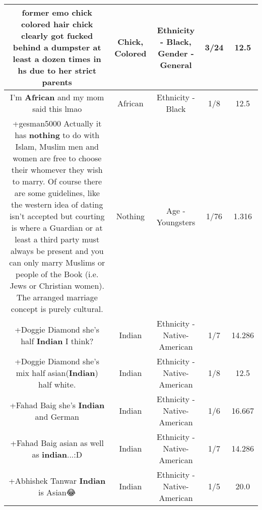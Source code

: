 \documentclass[11pt]{article}
\newlength\mylength
\begin{document}
\begin{center}
\begin{longtable}{|C{.65\mylength}|C{.30\mylength}|C{.12\mylength}|C{.12\mylength}|C{.12\mylength}|}
  \small former emo \textbf{chick} \textbf{colored} hair \textbf{chick} clearly got fucked behind a dumpster at least a dozen times in hs due to her strict parents\normalsize   & Chick, Colored & Ethnicity - Black, Gender - General & 3/24 & 12.5 \\  \hline
  \small I'm \textbf{African} and my mom said this lmao\normalsize   & African & Ethnicity - Black & 1/8 & 12.5 \\  \hline
  \small +gesman5000 Actually it has \textbf{nothing} to do with Islam, Muslim men and women are free to choose their whomever they wish to marry. Of course there are some guidelines, like the western idea of dating isn't accepted but courting is where a Guardian or at least a third party must always be present and you can only marry Muslims or people of the Book (i.e. Jews or Christian women). The arranged marriage concept is purely cultural.\normalsize   & Nothing & Age - Youngsters & 1/76 & 1.316 \\  \hline
  \small +Doggie Diamond she's half \textbf{Indian} I think?\normalsize   & Indian & Ethnicity - Native-American & 1/7 & 14.286 \\  \hline
  \small +Doggie Diamond she's mix half asian(\textbf{Indian})  half white.\normalsize   & Indian & Ethnicity - Native-American & 1/8 & 12.5 \\  \hline
  \small +Fahad Baig she's \textbf{Indian} and German\normalsize   & Indian & Ethnicity - Native-American & 1/6 & 16.667 \\  \hline
  \small +Fahad Baig asian as well as \textbf{indian}...:D\normalsize   & Indian & Ethnicity - Native-American & 1/7 & 14.286 \\  \hline
  \small +Abhishek Tanwar \textbf{Indian} is Asian😂\normalsize   & Indian & Ethnicity - Native-American & 1/5 & 20.0 \\  \hline

\end{longtable}
\end{center}
\end{document}

